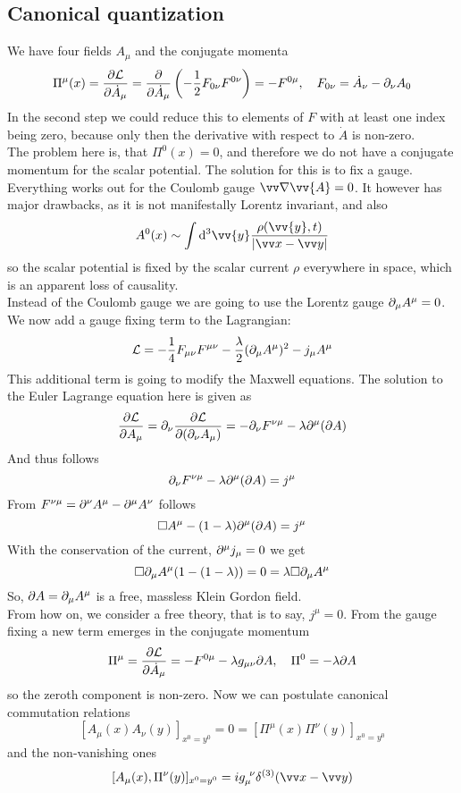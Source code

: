 \subsection{Canonical quantization}
We have four fields $A_\mu$ and the conjugate momenta
\[ \Pi^\mu(x) = \frac{ \partial \mathcal{L}}{\partial \dot A_\mu} = \frac{\partial}{\partial \dot A_\mu} \left( - \frac{1}{2} F_{0\nu}F^{0\nu}\right) = - F^{0 \mu}, ~~~ F_{0\nu} = \dot A _\nu - \partial_\nu A_0 \]
In the second step we could reduce this to elements of $F$ with at least one index being zero, because only then the derivative with respect to $\dot A$ is non-zero.\\
The problem here is, that $\Pi^0(x) = 0$, and therefore we do not have a conjugate momentum for the scalar potential.
The solution for this is to fix a gauge. Everything works out for the Coulomb gauge $\vn \vv{A} = 0$. 
It however has major drawbacks, as it is not manifestally Lorentz invariant, and also 
\[A^0(x) \sim \int \dd ^3 \vv{y} \frac{\rho(\vv{y},t)}{| \vx - \vy|}\]
so the scalar potential is fixed by the scalar current $\rho$ everywhere in space, which is an apparent loss of causality.\\
Instead of the Coulomb gauge we are going to use the Lorentz gauge $\partial_\mu A^\mu = 0$.
We now add a gauge fixing term to the Lagrangian:
\[ \mathcal{L} = - \frac{1}{4} F_{\mu\nu}F^{\mu\nu} - \frac{\lambda}{2}( \partial_\mu A^\mu) ^2 - j_\mu A^\mu\]
This additional term is going to modify the Maxwell equations. The solution to the Euler Lagrange equation here is given as
\[\frac{\partial \mathcal{L}}{\partial A_\mu} = \partial_\nu \frac{\partial \mathcal{L}}{\partial(\partial_\nu A_\mu)} = - \partial_\nu F^{\nu\mu} - \lambda \partial^\mu( \partial A)\]
And thus follows
\[ \partial_\nu F^{\nu\mu} - \lambda \partial^\mu( \partial A) = j^\mu\]
From $F^{\nu\mu} = \partial^\nu A^\mu - \partial^\mu A^\nu$ follows
\[ \square A^\mu - (1-\lambda)\partial^\mu (\partial A) = j^\mu\]
With the conservation of the current, $\partial^\mu j_\mu = 0$ we get
\[ \square \partial_\mu A^\mu (1 - (1- \lambda)) = 0 = \lambda \square \partial_\mu A^\mu\]
So, $\partial A = \partial_\mu A^\mu$ is a free, massless Klein Gordon field.\\
From how on, we consider a free theory, that is to say, $j^\mu = 0$. From the gauge fixing a new term emerges in the conjugate momentum
\[ \Pi^\mu = \frac{\partial \mathcal{L}}{\partial \dot A_\mu} = - F^{0\mu} - \lambda g_{\mu\nu} \partial A, ~~~ \Pi^0 = - \lambda \partial A\]
so the zeroth component is non-zero.
Now we can postulate canonical commutation relations
\[ [A_\mu(x) A_\nu(y)]_{x^0 = y^0} = 0 = [ \Pi^\mu(x) \Pi^\nu(y)]_{x^0 = y^0}\]
and the non-vanishing ones
\[ [A_\mu(x), \Pi^\nu(y)]_{x^0=y^0} = i g_\mu^{~\nu} \delta^{(3)}(\vx - \vy)\]
